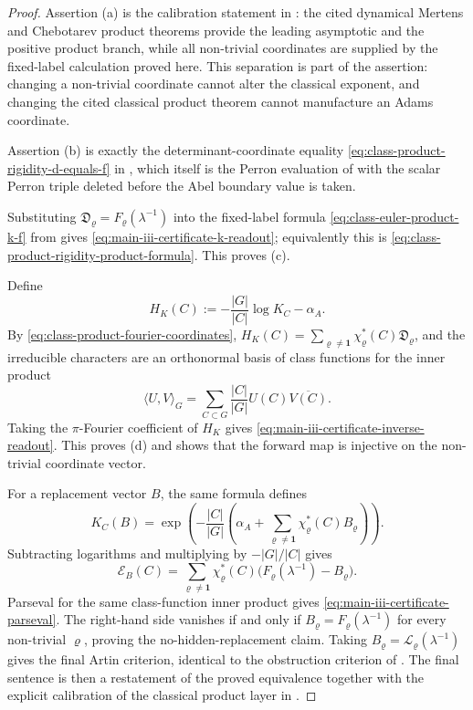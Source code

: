 \documentclass[11pt,a4paper]{amsart}
\theoremstyle{plain}
\theoremstyle{definition}
\theoremstyle{remark}
\begin{document}
\begin{proof}
  Assertion \textup{(a)} is the calibration statement in
  : the cited dynamical Mertens and
  Chebotarev product theorems provide the leading asymptotic and the positive
  product branch, while all non-trivial coordinates are supplied by the
  fixed-label calculation proved here.  This separation is part of the assertion: changing
  a non-trivial coordinate cannot alter the classical exponent, and changing
  the cited classical product theorem cannot manufacture an Adams coordinate.

  Assertion \textup{(b)} is exactly the determinant-coordinate equality
  \eqref{eq:class-product-rigidity-d-equals-f} in
  , which itself is the Perron
  evaluation of  with the scalar
  Perron triple deleted before the Abel boundary value is taken.

  Substituting \(\mathfrak D_\varrho=F_\varrho(\lambda^{-1})\) into the
  fixed-label formula \eqref{eq:class-euler-product-k-f} from
   gives
  \eqref{eq:main-iii-certificate-k-readout}; equivalently this is
  \eqref{eq:class-product-rigidity-product-formula}.  This proves
  \textup{(c)}.

  Define
  \[
    H_K(C):=-\frac{|G|}{|C|}\log K_C-\alpha_A .
  \]
  By \eqref{eq:class-product-fourier-coordinates},
  \(H_K(C)=\sum_{\varrho\neq\mathbf1}\chi_\varrho^\ast(C)\mathfrak D_\varrho\),
  and the irreducible characters are an orthonormal basis of class functions
  for the inner product
  \[
    \langle U,V\rangle_G
    =
    \sum_{C\subset G}\frac{|C|}{|G|}U(C)\overline{V(C)} .
  \]
  Taking the \(\pi\)-Fourier coefficient of \(H_K\) gives
  \eqref{eq:main-iii-certificate-inverse-readout}.  This proves
  \textup{(d)} and shows that the forward map is injective on the
  non-trivial coordinate vector.

  For a replacement vector \(B\), the same formula defines
  \[
    K_C(B)=
    \exp\!\left(
      -\frac{|C|}{|G|}
      \left(
        \alpha_A+
        \sum_{\varrho\neq\mathbf1}
          \chi_\varrho^\ast(C)B_\varrho
      \right)
    \right).
  \]
  Subtracting logarithms and multiplying by \(-|G|/|C|\) gives
  \[
    \mathscr E_B(C)=
    \sum_{\varrho\neq\mathbf1}
      \chi_\varrho^\ast(C)
      \bigl(F_\varrho(\lambda^{-1})-B_\varrho\bigr).
  \]
  Parseval for the same class-function inner product gives
  \eqref{eq:main-iii-certificate-parseval}.  The right-hand side vanishes if
  and only if \(B_\varrho=F_\varrho(\lambda^{-1})\) for every non-trivial
  \(\varrho\), proving the no-hidden-replacement claim.  Taking
  \(B_\varrho=\mathcal L_\varrho(\lambda^{-1})\) gives the final Artin
  criterion, identical to the obstruction criterion of
  .  The final sentence is then a
  restatement of the proved equivalence together with the explicit calibration
  of the classical product layer in .


\end{proof}
\end{document}

